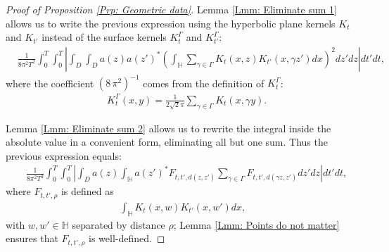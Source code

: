 \documentclass[11pt,twoside,reqno]{amsart} \usepackage{a4wide} \usepackage[T1]{fontenc} \usepackage[utf8]{inputenc} \usepackage{soul}  \usepackage{amsmath} \usepackage{amsfonts} \usepackage{amssymb} \usepackage{mathtools} \usepackage{amsthm} \usepackage{xcolor} \usepackage{graphicx} \usepackage{hyperref} \usepackage{standalone} \usepackage{esint} \usepackage{comment} \usepackage[left=2.3cm,top=3cm,right=2.3cm]{geometry} \usepackage{bm} \usepackage{svg} \usepackage{float} \numberwithin{equation}{section} \theoremstyle{plain} \newtheorem{thm}{Theorem}[section] \newtheorem{theorem}[thm]{Theorem} \newtheorem*{theorem*}{Theorem}\newtheorem{conj}[thm]{Conjecture} \newtheorem{lemma}[thm]{Lemma} \newtheorem{prop}[thm]{Proposition} \newtheorem{proposition}[thm]{Proposition} \newtheorem{cor}[thm]{Corollary} \newtheorem{question}[thm]{Question} \newtheorem{corollary}[thm]{Corollary} \newtheorem{assumption}[thm]{Assumption} \theoremstyle{definition} \newtheorem{defn}[thm]{Definition} \newtheorem{choice}[thm]{Choice} \newtheorem{definition}[thm]{Definition} \newtheorem{ex}[thm]{Example} \newtheorem{notation}[thm]{Notation} \newtheorem*{ack}{Acknowledgements} \theoremstyle{remark} \newtheorem{remark}[thm]{Remark} \newtheorem{bigremark}[thm]{Remark} \usepackage{xcolor} \newcommand{\red}[1]{ {\color{Red}#1} } \newcommand{\blue}[1]{ {\color{Blue}#1} } \author{Kai Hippi} \address{Aalto University, Espoo, Finland} \email{kai.hippi@aalto.fi}
\begin{document}
\begin{proof}[Proof of Proposition \ref{Prp: Geometric data}]
Lemma \ref{Lmm: Eliminate sum 1} allows us to write the previous expression using the hyperbolic plane kernels $ K_{t} $ and $ K_{t'} $ instead of the surface kernels $ K_{t}^{\Gamma} $ and $ K_{t'}^{\Gamma} $: 
\begin{align*}
	&
	\frac{1}{8 \pi^{2} T^{2}} \int_{0}^{T} \int_{0}^{T} \left| \int_{D} \int_{D} a( z ) a( z' )^{*} \left( \int_{\mathbb{H}} \sum_{\gamma \in \Gamma}^{} K_{t}( x,z ) K_{t'}( x, \gamma z' ) dx \right)^{2} dz' dz \right| dt' dt,
\end{align*}
where the coefficient $ ( 8 \, \pi^{2} )^{-1} $ comes from the definition of $ K_{t}^{\Gamma} $:
\begin{align*}
	&
	K_{t}^{\Gamma}( x,y ) = \frac{1}{2 \sqrt{2 }\pi} \sum_{\gamma \in \Gamma}^{} K_{t}( x, \gamma y ).
\end{align*}


Lemma \ref{Lmm: Eliminate sum 2} allows us to rewrite the integral inside the absolute value in a convenient form, eliminating all but one sum. Thus the previous expression equals:
\begin{align}
	&
	\label{Expr: Introducing F}
	\frac{1}{ 8 \pi^{2} T^{2}} \int_{0}^{T} \int_{0}^{T} \left| \int_{D} a( z ) \int_{\mathbb{H}} a( z' )^{*}   F_{t,t', d( z,z' )}  \sum_{\gamma \in \Gamma}^{} F_{t,t', d( \gamma z, z' )} dz' dz \right| dt' dt,
\end{align}
where $ F_{t,t', \rho} $ is defined as
\begin{align*}
\int_{\mathbb{H}} K_{t}( x,w ) K_{t'}( x,w' ) dx,
\end{align*}
with $ w, w' \in \mathbb{H} $ separated by distance $ \rho $; Lemma \ref{Lmm: Points do not matter} ensures that $ F_{t,t',\rho} $ is well-defined. 


\end{proof}
\end{document}
